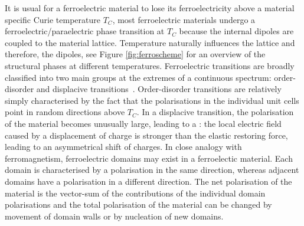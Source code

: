 It is usual for a ferroelectric material to lose its ferroelectricity above a material specific Curie temperature $T_C$, \ie{} most ferroelectric materials undergo a ferroelectric/paraelectric phase transition at $T_C$ because the internal dipoles are coupled to the material lattice. Temperature naturally influences the lattice and therefore, the dipoles, see Figure \ref{fig:ferroscheme} for an overview of the structural phases at different temperatures. Ferroelectric transitions are broadly classified into two main groups at the extremes of a continuous spectrum: order-disorder and displacive transitions~\cite[pp. 467 ff.]{kittel}. Order-disorder transitions are relatively simply characterised by the fact that the polarisations in the individual unit cells point in random directions above $T_C$. In a displacive transition, the polarisation of the material becomes unusually large, leading to a : the local electric field caused by a displacement of charge is stronger than the elastic restoring force, leading to an asymmetrical shift of charges. In close analogy with ferromagnetism, ferroelectric domains may exist in a ferroelectic material. Each domain is characterised by a polarisation in the same direction, whereas adjacent domains have a polarisation in a different direction. The net polarisation of the material is the vector-sum of the contributions of the individual domain polarisations and the total polarisation of the material can be changed by movement of domain walls or by nucleation of new domains.
\newpage
